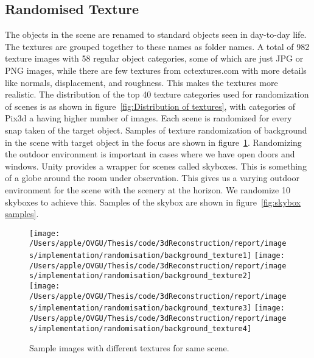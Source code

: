 \subsection{Randomised Texture}\label{subsec:randomised-texture}

The objects in the scene are renamed to standard objects seen in day-to-day life.
The textures are grouped together to these names as folder names.
A total of 982 texture images with 58 regular object categories, some of which are just JPG or PNG images, while there are few textures from cctextures.com with more details like normals, displacement, and roughness.
This makes the textures more realistic.
The distribution of the top 40 texture categories used for randomization of scenes is as shown in figure~\ref{fig:Distribution of textures}, with categories of Pix3d a having higher number of images.
Each scene is randomized for every snap taken of the target object.
Samples of texture randomization of background in the scene with target object in the focus are shown in figure~\ref{fig:Texture Randomisation}.
Randomizing the outdoor environment is important in cases where we have open doors and windows.
Unity provides a wrapper for scenes called skyboxes.
This is something of a globe around the room under observation.
This gives us a varying outdoor environment for the scene with the scenery at the horizon.
We randomize 10 skyboxes to achieve this.
Samples of the skybox are shown in figure~\ref{fig:skybox samples}.


\begin{figure}
    \centering
    \texttt{[image: /Users/apple/OVGU/Thesis/code/3dReconstruction/report/images/implementation/randomisation/background\_texture1]}
    \texttt{[image: /Users/apple/OVGU/Thesis/code/3dReconstruction/report/images/implementation/randomisation/background\_texture2]}\\
    \vspace{0.1cm}
    \texttt{[image: /Users/apple/OVGU/Thesis/code/3dReconstruction/report/images/implementation/randomisation/background\_texture3]}
    \texttt{[image: /Users/apple/OVGU/Thesis/code/3dReconstruction/report/images/implementation/randomisation/background\_texture4]}\\
    \caption{Sample images with different textures for same scene.}
    \label{fig:Texture Randomisation}
\end{figure}


